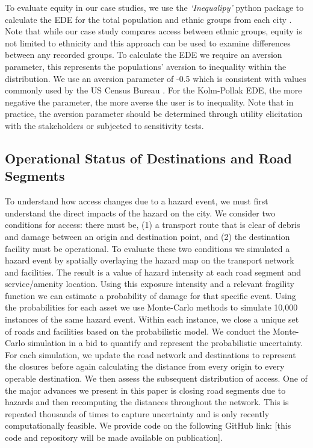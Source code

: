 \documentclass[review,3p,times,onecolumn,sort&compress,12pt]{elsarticle}
\let \cite \parencite
\begin{document}
To evaluate equity in our case studies, we use the \textit{`Inequalipy'} python package to calculate the EDE for the total population and ethnic groups from each city \cite{Logan2021-ineq}.
Note that while our case study compares access between ethnic groups, equity is not limited to ethnicity and this approach can be used to examine differences between any recorded groups.
To calculate the EDE we require an aversion parameter, this represents the populations' aversion to inequality within the distribution.
We use an aversion parameter of -0.5 which is consistent with values commonly used by the US Census Bureau \cite{Jones2000-xv}.
For the Kolm-Pollak EDE, the more negative the parameter, the more averse the user is to inequality.
Note that in practice, the aversion parameter should be determined through utility elicitation with the stakeholders or subjected to sensitivity tests.

\subsection{Operational Status of Destinations and Road Segments}
To understand how access changes due to a hazard event, we must first understand the direct impacts of the hazard on the city.
We consider two conditions for access: there must be, (1) a transport route that is clear of debris and damage between an origin and destination point, and (2) the destination facility must be operational.
To evaluate these two conditions we simulated a hazard event by spatially overlaying the hazard map on the transport network and facilities.
The result is a value of hazard intensity at each road segment and service/amenity location.
Using this exposure intensity and a relevant fragility function we can estimate a probability of damage for that specific event.
Using the probabilities for each asset we use Monte-Carlo methods to simulate 10,000 instances of the same hazard event.
Within each instance, we close a unique set of roads and facilities based on the probabilistic model.
We conduct the Monte-Carlo simulation in a bid to quantify and represent the probabilistic uncertainty. 
For each simulation, we update the road network and destinations to represent the closures before again calculating the distance from every origin to every operable destination.
We then assess the subsequent distribution of access.
One of the major advances we present in this paper is closing road segments due to hazards and then recomputing the distances throughout the network.
This is repeated thousands of times to capture uncertainty and is only recently computationally feasible.
We provide code on the following GitHub link: [this code and repository will be made available on publication].
\end{document}

